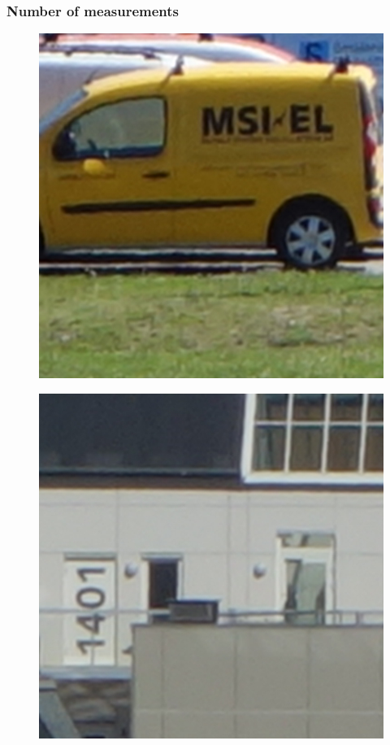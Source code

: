 \subsubsection{Number of measurements}
\begin{figure}[H]
\begin{minipage}[t]{0.3\linewidth} %
	\includegraphics[width = 1\linewidth]{gfx/car/car_org.png}
	\label{fig:car_org}
\end{minipage}
\begin{minipage}[t]{0.3\linewidth} %
	\includegraphics[width = 1\linewidth]{gfx/hus/hus_org.png}

\end{minipage}
\end{figure}
